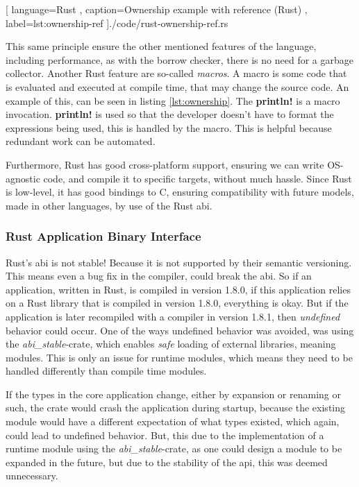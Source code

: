 \begin{center}
  
    [ language=Rust
    , caption={Ownership example with reference (Rust)}
    , label=lst:ownership-ref
    ]{./code/rust-ownership-ref.rs}
\end{center}

This same principle ensure the other mentioned features of the language,
including performance, as with the borrow checker, there is no need for a
garbage collector. Another Rust feature are so-called \textit{macros}. A macro
is some code that is evaluated and executed at compile time, that may change
the source code. An example of this, can be seen in listing \ref{lst:ownership}.
The \textbf{println!} is a macro invocation. \textbf{println!} is used so that
the developer doesn't have to format the expressions being used, this is handled
by the macro. This is helpful because redundant work can be automated.

Furthermore, Rust has good cross-platform support, ensuring
we can write OS-agnostic code, and compile it to specific targets, without much
hassle. Since Rust is low-level, it has good bindings to C, ensuring
compatibility with future models, made in other languages, by use of the Rust
\gls{abi}.

\subsubsection{Rust Application Binary Interface}

Rust's \gls{abi} is not stable! Because it is not supported by their semantic
versioning. This means even a bug fix in the compiler, could break the
\gls{abi}. So if an application, written in Rust, is compiled in version 1.8.0,
if this application relies on a Rust library that is compiled in version 1.8.0,
everything is okay. But if the application is later recompiled with a compiler
in version 1.8.1, then \textit{undefined} behavior could occur. One of the ways
undefined behavior was avoided, was using the \textit{abi\_stable}-crate, which
enables \textit{safe} loading of external libraries, meaning modules. This is
only an issue for runtime modules, which means they need to be handled
differently than compile time modules.

If the types in the core application change, either by expansion or renaming or
such, the crate would crash the application during startup, because the existing
module would have a different expectation of what types existed, which again,
could lead to undefined behavior. But, this due to the implementation of a
runtime module using the \textit{abi\_stable}-crate, as one could design a
module to be expanded in the future, but due to the stability of the \gls{api},
this was deemed unnecessary.

